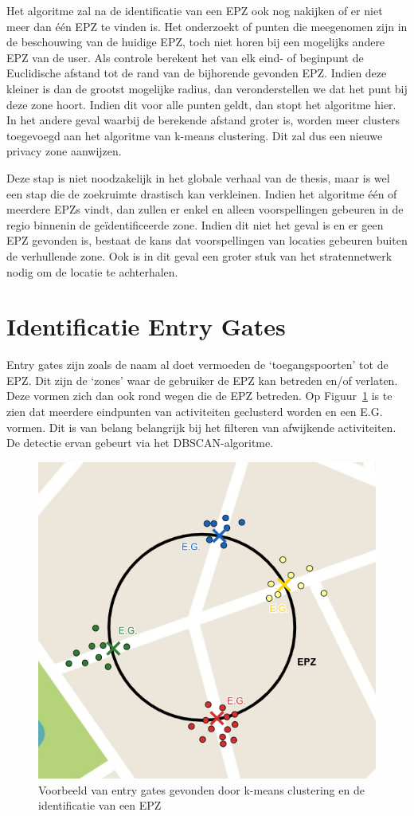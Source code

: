 Het algoritme zal na de identificatie van een \ac{EPZ} ook nog nakijken of er
niet meer dan één \ac{EPZ} te vinden is. Het onderzoekt of punten die
meegenomen zijn in de beschouwing van de huidige \ac{EPZ}, toch niet horen bij
een mogelijks andere \ac{EPZ} van de user. Als controle berekent het van elk
eind- of beginpunt de Euclidische afstand tot de rand van de bijhorende
gevonden \ac{EPZ}. Indien deze kleiner is dan de grootst mogelijke radius, dan
veronderstellen we dat het punt bij deze zone hoort. Indien dit voor alle
punten geldt, dan stopt het algoritme hier. In het andere geval waarbij de
berekende afstand groter is, worden meer clusters toegevoegd aan het algoritme
van k-means clustering. Dit zal dus een nieuwe privacy zone aanwijzen.

Deze stap is niet noodzakelijk in het globale verhaal van de thesis, maar is
wel een stap die de zoekruimte drastisch kan verkleinen. Indien het algoritme
één of meerdere \acp{EPZ} vindt, dan zullen er enkel en alleen voorspellingen
gebeuren in de regio binnenin de geïdentificeerde zone. Indien dit niet het
geval is en er geen \ac{EPZ} gevonden is, bestaat de kans dat voorspellingen
van locaties gebeuren buiten de verhullende zone. Ook is in dit geval een
groter stuk van het stratennetwerk nodig om de locatie te achterhalen.

\section{Identificatie Entry Gates}
Entry gates zijn zoals de naam al doet vermoeden de `toegangspoorten' tot de
\ac{EPZ}. Dit zijn de `zones' waar de gebruiker de \ac{EPZ} kan betreden en/of
verlaten. Deze vormen zich dan ook rond wegen die de \ac{EPZ} betreden. Op
Figuur~\ref{fig:entrygate} is te zien dat meerdere eindpunten van activiteiten
geclusterd worden en een \ac{E.G.} vormen. Dit is van belang belangrijk bij het
filteren van afwijkende activiteiten. De detectie ervan gebeurt via het
\ac{DBSCAN}-algoritme.
\begin{figure}
    \centering
    \includegraphics[width=0.5\linewidth]{fig/EPZ-mechanisme/Entry_Gate.png}
    \caption{Voorbeeld van entry gates gevonden door k-means clustering en de identificatie van een \ac{EPZ}}\label{fig:entrygate}
\end{figure}

